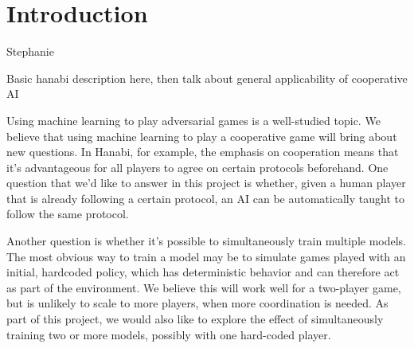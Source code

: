 \section{Introduction}
\label{intro}

Stephanie

Basic hanabi description here, then talk about general applicability of cooperative AI

Using machine learning to play adversarial games is a well-studied topic. We believe that using machine learning to play a cooperative game will bring about new questions. In Hanabi, for example, the emphasis on cooperation means that it’s advantageous for all players to agree on certain protocols beforehand. One question that we’d like to answer in this project is whether, given a human player that is already following a certain protocol, an AI can be automatically taught to follow the same protocol.

Another question is whether it’s possible to simultaneously train multiple models. The most obvious way to train a model may be to simulate games played with an initial, hardcoded policy, which has deterministic behavior and can therefore act as part of the environment. We believe this will work well for a two-player game, but is unlikely to scale to more players, when more coordination is needed. As part of this project, we would also like to explore the effect of simultaneously training two or more models, possibly with one hard-coded player.
